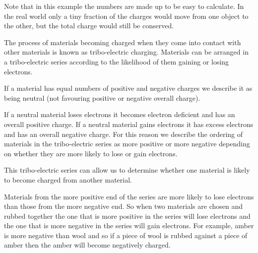 \begin{minipage}{.4\textwidth}

      \label{m38780*id200825}Note that in this example the numbers are made up to be easy to calculate. In the real world only a tiny fraction of the charges would move from one object to the other, but the total charge would still be conserved.\par 
{}

The process of materials becoming charged when they come into contact with other materials is known as tribo-electric charging. Materials can be arranged in a tribo-electric series according to the likelihood of them gaining or losing electrons. 

If a material has equal numbers of positive and negative charges we describe it as being neutral (not favouring positive or negative overall charge).

If a neutral material loses electrons it becomes electron deficient and has an overall positive charge. If a neutral material gains electrons it has excess electrons and has an overall negative charge. For this reason we describe the ordering of materials in the tribo-electric series as more positive or more negative depending on whether they are more likely to lose or gain electrons.

This tribo-electric series can allow us to determine whether one material is likely to become charged from another material. 

Materials from the more positive end of the series are more likely to lose electrons than those from the more negative end. So when two materials are chosen and rubbed together the one that is more positive in the series will lose electrons and the one that is more negative in the series will gain electrons.
 For example, amber is more negative than wool and so if a piece of wool is rubbed against a piece of amber then the amber will become negatively charged.\end{minipage}
